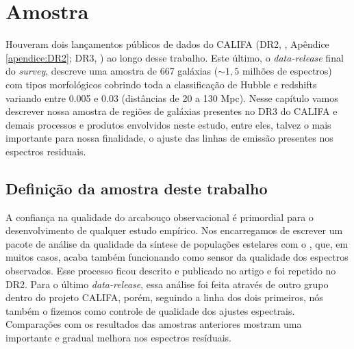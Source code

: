 


\chapter{Amostra}
\label{sec:sample}

Houveram dois lançamentos públicos de dados do CALIFA (DR2, \citealt{GarciaBenito.etal.2015a}, Apêndice \ref{apendice:DR2}; DR3, \citealt{SFSanchez.DR3.2016}) ao longo desse trabalho. Este último, o {\em data-release} final do {\em survey}, descreve uma amostra de 667 galáxias ($\sim 1,5$ milhões de espectros) com tipos morfológicos cobrindo toda a classificação de Hubble e redshifts variando entre 0.005 e 0.03 (distâncias de 20 a 130 Mpc). Nesse capítulo vamos descrever nossa amostra de regiões de galáxias presentes no DR3 do CALIFA e demais processos e produtos envolvidos neste estudo, entre eles, talvez o mais importante para nossa finalidade, o ajuste das linhas de emissão presentes nos espectros residuais.


\section{Definição da amostra deste trabalho}
\label{sec:sample:definicao}

A confiança na qualidade do arcabouço observacional é primordial para o desenvolvimento de qualquer estudo empírico. Nos encarregamos de escrever um pacote de análise da qualidade da síntese de populações estelares com o \starlight, que, em muitos casos, acaba também funcionando como sensor da qualidade dos espectros observados. Esse processo ficou descrito e publicado no artigo \citet[][DR1]{Husemann.etal.2013a} e foi repetido no DR2. Para o último {\em data-release}, essa análise foi feita através de outro grupo dentro do projeto CALIFA, porém, seguindo a linha dos dois primeiros, nós também o fizemos como controle de qualidade dos ajustes espectrais. Comparações com os resultados das amostras anteriores mostram uma importante e gradual melhora nos espectros resíduais.

